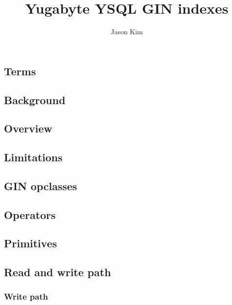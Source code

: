 \documentclass[11pt]{article}
\title{Yugabyte YSQL GIN indexes}
\author{
    Jason Kim
}
\begin{document}
\maketitle

\hypertarget{terms}{%
\subsection{Terms}\label{terms}}


\hypertarget{background}{%
\subsection{Background}\label{background}}


\hypertarget{overview}{%
\subsection{Overview}\label{overview}}


\hypertarget{limitations}{%
\subsection{Limitations}\label{limitations}}


\hypertarget{gin-opclasses}{%
\subsection{GIN opclasses}\label{gin-opclasses}}


\hypertarget{operators}{%
\subsection{Operators}\label{operators}}


\hypertarget{primitives}{%
\subsection{Primitives}\label{primitives}}


\hypertarget{read-and-write-path}{%
\subsection{Read and write path}\label{read-and-write-path}}

\hypertarget{write-path}{%
\subsubsection{Write path}\label{write-path}}

\end{document}
